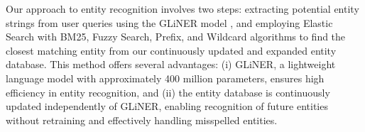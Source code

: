 \documentclass[runningheads]{llncs}
\begin{document}


Our approach to entity recognition involves two steps: extracting potential entity strings from user queries using the GLiNER model \cite{zaratiana2023glinergeneralistmodelnamed}, and employing Elastic Search with BM25, Fuzzy Search, Prefix, and Wildcard algorithms to find the closest matching entity from our continuously updated and expanded entity database.
This method offers several advantages: (i) GLiNER, a lightweight language model with approximately 400 million parameters, ensures high efficiency in entity recognition, and (ii) the entity database is continuously updated independently of GLiNER, enabling recognition of future entities without retraining and effectively handling misspelled entities.

\end{document}
